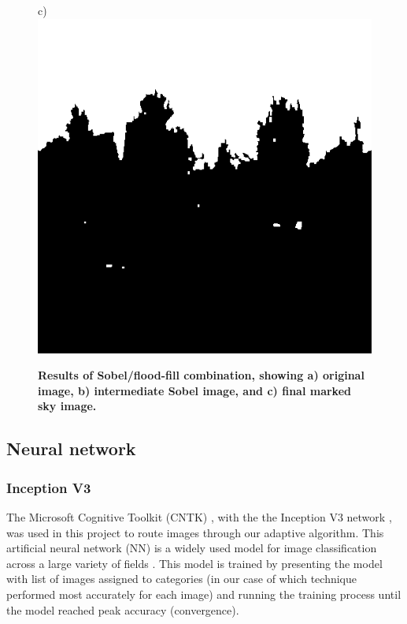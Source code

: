 \documentclass[final,3p,times,authoryear]{elsarticle}
\begin{document}
\begin{figure}
{c)\includegraphics[scale=0.20]{Images/FloodfillOutput.png}
}
\caption{\bf   Results of Sobel/flood-fill combination, showing a) original image, b) intermediate Sobel image, and c) final marked sky image.}    
 \label{fig:sobelflood}  
\end{figure} 

\subsection{Neural network}\label{sec:nn}

\subsubsection{Inception V3}\label{sec:inception}
The Microsoft Cognitive Toolkit (CNTK) \citep{Yu2015,Agarwal2016}, with the the Inception V3 network \citep{Szegedy2015a}, was used in this project to route images through our adaptive algorithm. This artificial neural network (NN) is a widely used model for image classification across a large variety of fields \citep{Xia2017,Hassannejad2016}. This model is trained by presenting the model with list of images assigned to categories (in our case of which technique performed most accurately for each image) and running the training process until the model reached peak accuracy (convergence).
\end{document}
